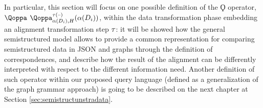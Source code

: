 In particular, this section will focus on one possible definition of the $\Qoppa$ operator, $\qtranslIndex{for nested schema alignment}$ $\qtransl^{\ttransl(\textup{--})}_{\abstr(D_i),H}(\abstr(D_i))$, within the data transformation phase embedding an alignment transformation step $\ttransl$: it will be showed how the general semistructured model allows to provide a common representation for comparing semistructured data in JSON and graphs through the definition of correspondences, and describe how the result of the alignment can be differently interpreted with respect to the different information need. Another definition of such operator within our proposed query language (defined as a generalization of the graph grammar approach) is going to be described on the next chapter at Section \vref{sec:semistructunstradata}.

